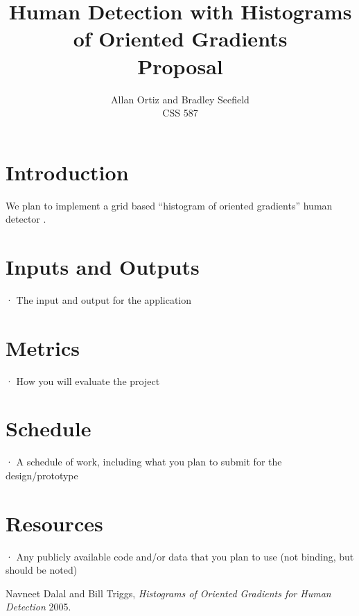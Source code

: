 \documentclass[a4paper,11pt]{article}
\title{Human Detection with Histograms of Oriented Gradients\\
       Proposal}
\author{Allan Ortiz and Bradley Seefield\\
	CSS 587}
\begin{document}
\maketitle

\section{Introduction} %
We plan to implement a grid based ``histogram of oriented gradients'' human detector \cite{dalal05}.

\section{Inputs and Outputs}
·         The input and output for the application
\section{Metrics}
·         How you will evaluate the project
\section{Schedule}
·         A schedule of work, including what you plan to submit for the design/prototype
\section{Resources}
·         Any publicly available code and/or data that you plan to use (not binding, but should be noted)


 \begin{thebibliography}{1}

   Navneet Dalal and Bill Triggs, {\em Histograms of Oriented
  Gradients for Human Detection} 2005.

  \end{thebibliography}
\end{document}
